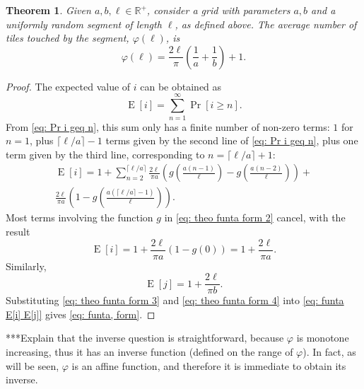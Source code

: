 \documentclass[12pt, a4paper]{article}
\DeclareMathOperator{\E}{E}
\newcommand{\funta}{\varphi} %
\newcommand{\len}{\ell} %
\newtheorem{theorem}{Theorem}%
\begin{document}
\begin{theorem}
\label{theo: funta, form}
Given $a, b, \len \in \mathbb R^+$, consider a grid with parameters $a, b$ and a uniformly random segment of length $\len$, as defined above. The average number of tiles touched by the segment, $\funta(\len)$, is 
\begin{equation}
\label{eq: funta, form}
\funta(\len) = \frac{2\len}{\pi}\left(\frac 1 a + \frac 1 b\right) + 1.
\end{equation}
\end{theorem}

\begin{proof}
The expected value of $i$ can be obtained as
\begin{equation}
\label{eq: theo funta form 1}
\E[i] = \sum_{n=1}^\infty \Pr[i \geq n].
\end{equation}
From \eqref{eq: Pr i geq n}, this sum only has a finite number of non-zero terms: $1$ for $n=1$, plus $\lceil \len/a \rceil-1$ terms given by the second line of \eqref{eq: Pr i geq n}, plus one term given by the third line, corresponding to $n = \lceil \len/a \rceil +1 $:
\begin{equation}
\label{eq: theo funta form 2}
\begin{split}
\E[i] = 1 +
\sum_{n=2}^{\lceil \len/a \rceil} \frac{2\len}{\pi a} \left(g\left(\frac{a(n-1)}{\len}\right)-g\left(\frac{a(n-2)}{\len} \right)\right) + \\
\frac{2\len}{\pi a} \left(1-g\left(\frac{a(\lceil \len/a \rceil - 1)}{\len} \right)\right).
\end{split}
\end{equation}
Most terms involving the function $g$ in \eqref{eq: theo funta form 2} cancel, with the result
\begin{equation}
\label{eq: theo funta form 3}
\E[i] = 1+\frac{2\len}{\pi a} (1-g(0))= 1+\frac{2\len}{\pi a}.
\end{equation}
Similarly,
\begin{equation}
\label{eq: theo funta form 4}
\E[j] = 1+\frac{2\len}{\pi b}.
\end{equation}
Substituting \eqref{eq: theo funta form 3} and \eqref{eq: theo funta form 4} into \eqref{eq: funta E[i] E[j]} gives \eqref{eq: funta, form}.
\end{proof}

***Explain that the inverse question is straightforward, because $\funta$ is monotone increasing, thus it has an inverse function (defined on the range of $\funta$). In fact, as will be seen, $\funta$ is an affine function, and therefore it is immediate to obtain its inverse.
\end{document}
